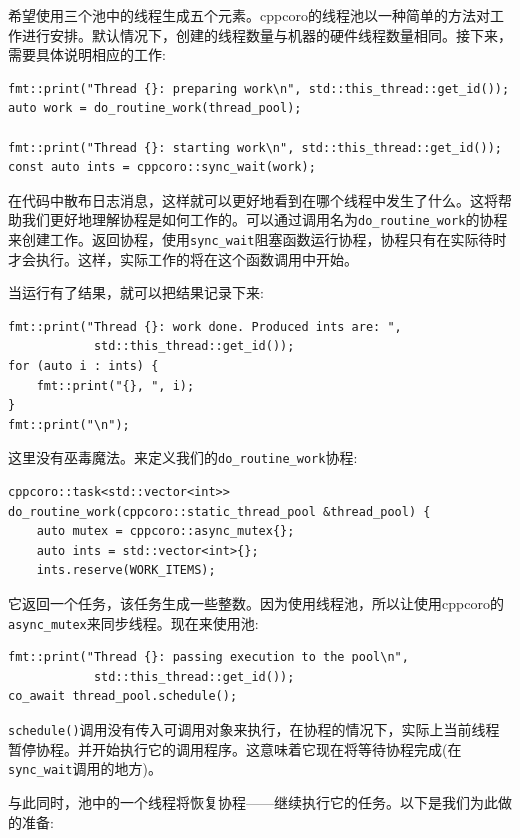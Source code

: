 希望使用三个池中的线程生成五个元素。cppcoro的线程池以一种简单的方法对工作进行安排。默认情况下，创建的线程数量与机器的硬件线程数量相同。接下来，需要具体说明相应的工作:

\begin{lstlisting}[style=styleCXX]
fmt::print("Thread {}: preparing work\n", std::this_thread::get_id());
auto work = do_routine_work(thread_pool);

fmt::print("Thread {}: starting work\n", std::this_thread::get_id());
const auto ints = cppcoro::sync_wait(work);
\end{lstlisting}

在代码中散布日志消息，这样就可以更好地看到在哪个线程中发生了什么。这将帮助我们更好地理解协程是如何工作的。可以通过调用名为\texttt{do\_routine\_work}的协程来创建工作。返回协程，使用\texttt{sync\_wait}阻塞函数运行协程，协程只有在实际待时才会执行。这样，实际工作的将在这个函数调用中开始。

当运行有了结果，就可以把结果记录下来:

\begin{lstlisting}[style=styleCXX]
fmt::print("Thread {}: work done. Produced ints are: ",
			std::this_thread::get_id());
for (auto i : ints) {
	fmt::print("{}, ", i);
}
fmt::print("\n");
\end{lstlisting}

这里没有巫毒魔法。来定义我们的\texttt{do\_routine\_work}协程:

\begin{lstlisting}[style=styleCXX]
cppcoro::task<std::vector<int>>
do_routine_work(cppcoro::static_thread_pool &thread_pool) {
	auto mutex = cppcoro::async_mutex{};
	auto ints = std::vector<int>{};
	ints.reserve(WORK_ITEMS);
\end{lstlisting}

它返回一个任务，该任务生成一些整数。因为使用线程池，所以让使用cppcoro的\texttt{async\_mutex}来同步线程。现在来使用池:

\begin{lstlisting}[style=styleCXX]
fmt::print("Thread {}: passing execution to the pool\n",
			std::this_thread::get_id());
co_await thread_pool.schedule();
\end{lstlisting}

\texttt{schedule()}调用没有传入可调用对象来执行，在协程的情况下，实际上当前线程暂停协程。并开始执行它的调用程序。这意味着它现在将等待协程完成(在\texttt{sync\_wait}调用的地方)。

与此同时，池中的一个线程将恢复协程——继续执行它的任务。以下是我们为此做的准备:

